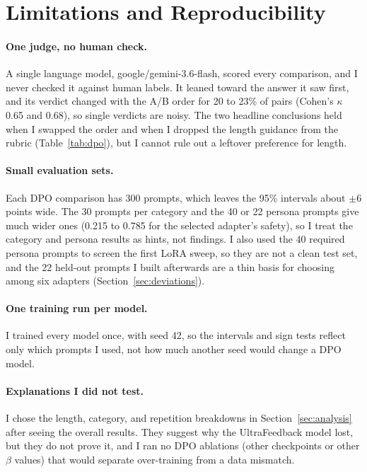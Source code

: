 \section{Limitations and Reproducibility}
\label{sec:limits}

\paragraph{One judge, no human check.} A single language model, google/gemini-3.6-flash, scored every comparison, and I never checked it against human labels. It leaned toward the answer it saw first, and its verdict changed with the A/B order for 20 to 23\% of pairs (Cohen's $\kappa$ 0.65 and 0.68), so single verdicts are noisy. The two headline conclusions held when I swapped the order and when I dropped the length guidance from the rubric (Table~\ref{tab:dpo}), but I cannot rule out a leftover preference for length.

\paragraph{Small evaluation sets.} Each DPO comparison has 300 prompts, which leaves the 95\% intervals about $\pm$6 points wide. The 30 prompts per category and the 40 or 22 persona prompts give much wider ones (0.215 to 0.785 for the selected adapter's safety), so I treat the category and persona results as hints, not findings. I also used the 40 required persona prompts to screen the first LoRA sweep, so they are not a clean test set, and the 22 held-out prompts I built afterwards are a thin basis for choosing among six adapters (Section~\ref{sec:deviations}).

\paragraph{One training run per model.} I trained every model once, with seed 42, so the intervals and sign tests reflect only which prompts I used, not how much another seed would change a DPO model.

\paragraph{Explanations I did not test.} I chose the length, category, and repetition breakdowns in Section~\ref{sec:analysis} after seeing the overall results. They suggest why the UltraFeedback model lost, but they do not prove it, and I ran no DPO ablations (other checkpoints or other $\beta$ values) that would separate over-training from a data mismatch.

